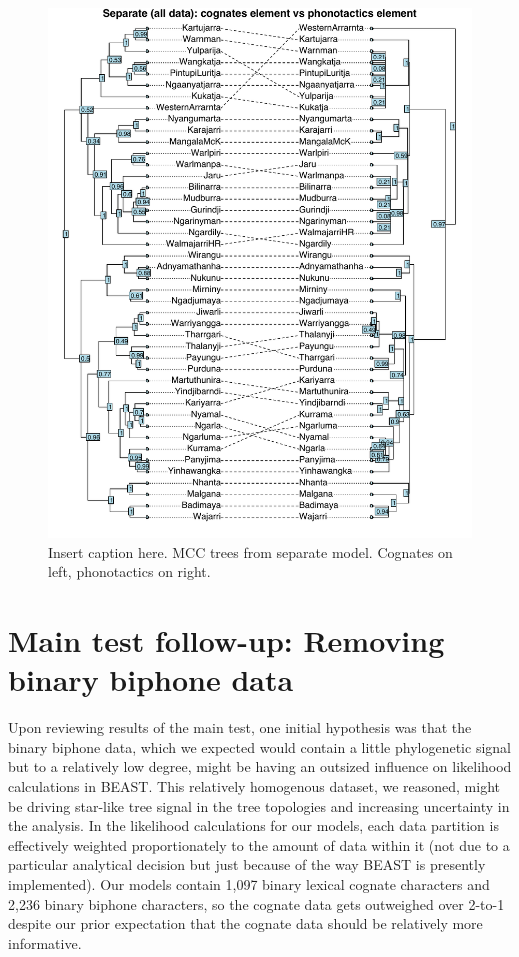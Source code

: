 \documentclass[]{article}
\begin{document}
\begin{figure}
\centering
\includegraphics{fig/separate_cogs_vs_phonotactics_alldata.pdf}
\caption{\label{fig:separate-cogs-vs-phonotactics-all}Insert caption here. MCC trees from separate model. Cognates on left, phonotactics on right.}
\end{figure}

\hypertarget{main-test-follow-up-removing-binary-biphone-data}{%
\section{Main test follow-up: Removing binary biphone data}\label{main-test-follow-up-removing-binary-biphone-data}}

Upon reviewing results of the main test, one initial hypothesis was that the binary biphone data, which we expected would contain a little phylogenetic signal but to a relatively low degree, might be having an outsized influence on likelihood calculations in BEAST. This relatively homogenous dataset, we reasoned, might be driving star-like tree signal in the tree topologies and increasing uncertainty in the analysis. In the likelihood calculations for our models, each data partition is effectively weighted proportionately to the amount of data within it (not due to a particular analytical decision but just because of the way BEAST is presently implemented). Our models contain 1,097 binary lexical cognate characters and 2,236 binary biphone characters, so the cognate data gets outweighed over 2-to-1 despite our prior expectation that the cognate data should be relatively more informative.
\end{document}
